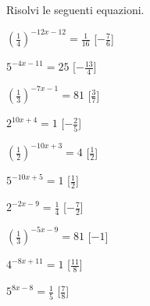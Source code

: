 \begin{esercizio}\label{ese:}
 Risolvi le seguenti equazioni.
\begin{multicols}{2}
 \begin{enumeratea}
  \item  \(\left(\frac{1}{4}\right)^{-12 x -12} = \frac{1}{16}\)
   \hfill [\(-\frac{7}{6}\)]
  \item  \(5^{-4 x -11} = 25\)
   \hfill [\(-\frac{13}{4}\)]
  \item  \(\left(\frac{1}{3}\right)^{-7 x -1} = 81\)
   \hfill [\(\frac{3}{7}\)]
  \item  \(2^{10 x +4} = 1\)
   \hfill [\(-\frac{2}{5}\)]
  \item  \(\left(\frac{1}{2}\right)^{-10 x +3} = 4\)
   \hfill [\(\frac{1}{2}\)]
  \item  \(5^{-10 x +5} = 1\)
   \hfill [\(\frac{1}{2}\)]
  \item  \(2^{-2 x -9} = \frac{1}{4}\)
   \hfill [\(-\frac{7}{2}\)]
  \item  \(\left(\frac{1}{3}\right)^{-5 x -9} = 81\)
   \hfill [\(-1\)]
  \item  \(4^{-8 x +11} = 1\)
   \hfill [\(\frac{11}{8}\)]
  \item  \(5^{8 x -8} = \frac{1}{5}\)
   \hfill [\(\frac{7}{8}\)]

\end{enumeratea}
\end{multicols}
\end{esercizio}
